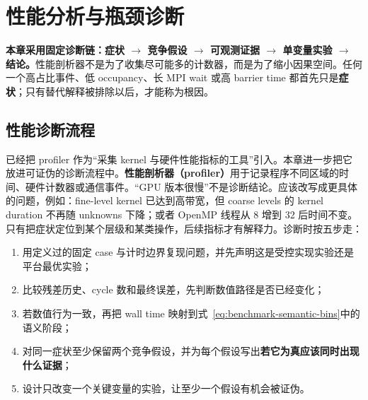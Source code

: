 \chapter{性能分析与瓶颈诊断}
\label{ch:diagnosis}

\begin{keybox}
\textbf{本章采用固定诊断链：症状 $\rightarrow$ 竞争假设 $\rightarrow$ 可观测证据 $\rightarrow$ 单变量实验 $\rightarrow$ 结论。}性能剖析器不是为了收集尽可能多的计数器，而是为了缩小因果空间。任何一个高占比事件、低 occupancy、长 MPI wait 或高 barrier time 都首先只是\textbf{症状}；只有替代解释被排除以后，才能称为根因。
\end{keybox}

\section{性能诊断流程}
\label{sec:diagnosis-flow}
已经把 profiler 作为“采集 kernel 与硬件性能指标的工具”引入。本章进一步把它放进可证伪的诊断流程中。\textbf{性能剖析器（profiler）}用于记录程序不同区域的时间、硬件计数器或通信事件。“GPU 版本很慢”不是诊断结论。应该改写成更具体的问题，例如：fine-level kernel 已达到高带宽，但 coarse levels 的 kernel duration 不再随 unknowns 下降；或者 OpenMP 线程从 8 增到 32 后时间不变。只有把症状定位到某个层级和某类操作，后续指标才有解释力。诊断时按五步走：
\begin{enumerate}
\item 用定义过的固定 case 与计时边界复现问题，并先声明这是受控实现实验还是平台最优实验；
\item 比较残差历史、cycle 数和最终误差，先判断数值路径是否已经变化；
\item 若数值行为一致，再把 wall time 映射到式~\eqref{eq:benchmark-semantic-bins}中的语义阶段；
\item 对同一症状至少保留两个竞争假设，并为每个假设写出\textbf{若它为真应该同时出现什么证据}；
\item 设计只改变一个关键变量的实验，让至少一个假设有机会被证伪。
\end{enumerate}

